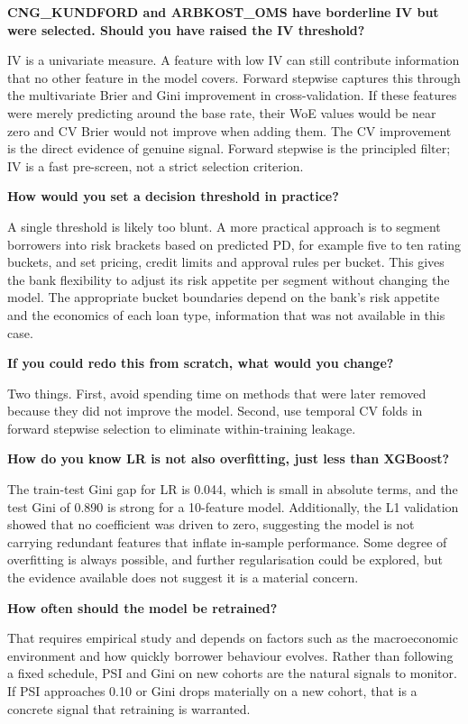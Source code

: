 \documentclass[a4paper,11pt]{article}
\begin{document}
\textbf{CNG\_KUNDFORD and ARBKOST\_OMS have borderline IV but were selected. Should you have raised the IV threshold?}

IV is a univariate measure. A feature with low IV can still contribute information
that no other feature in the model covers. Forward stepwise captures this through
the multivariate Brier and Gini improvement in cross-validation. If these features
were merely predicting around the base rate, their WoE values would be near zero
and CV Brier would not improve when adding them. The CV improvement is the direct
evidence of genuine signal. Forward stepwise is the principled filter; IV is a
fast pre-screen, not a strict selection criterion.

\textbf{How would you set a decision threshold in practice?}

A single threshold is likely too blunt. A more practical approach is to segment
borrowers into risk brackets based on predicted PD, for example five to ten rating
buckets, and set pricing, credit limits and approval rules per bucket. This gives
the bank flexibility to adjust its risk appetite per segment without changing the
model. The appropriate bucket boundaries depend on the bank's risk appetite and
the economics of each loan type, information that was not available in this case.

\textbf{If you could redo this from scratch, what would you change?}

Two things. First, avoid spending time on methods that were later removed because
they did not improve the model. Second, use temporal CV folds in forward stepwise
selection to eliminate within-training leakage.

\textbf{How do you know LR is not also overfitting, just less than XGBoost?}

The train-test Gini gap for LR is 0.044, which is small in absolute terms, and
the test Gini of 0.890 is strong for a 10-feature model. Additionally, the L1
validation showed that no coefficient was driven to zero, suggesting the model
is not carrying redundant features that inflate in-sample performance. Some degree
of overfitting is always possible, and further regularisation could be explored,
but the evidence available does not suggest it is a material concern.

\textbf{How often should the model be retrained?}

That requires empirical study and depends on factors such as the macroeconomic
environment and how quickly borrower behaviour evolves. Rather than following a
fixed schedule, PSI and Gini on new cohorts are the natural signals to monitor.
If PSI approaches 0.10 or Gini drops materially on a new cohort, that is a
concrete signal that retraining is warranted.
\end{document}
